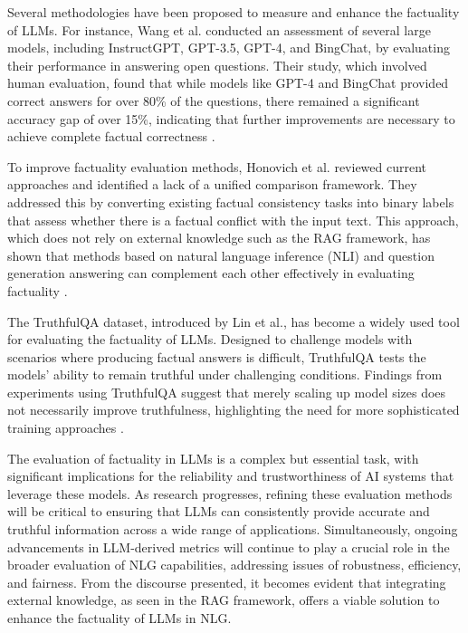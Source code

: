 Several methodologies have been proposed to measure and enhance the factuality of LLMs. For instance, Wang et al. conducted an assessment of several large models, including InstructGPT, GPT-3.5, GPT-4, and BingChat, by evaluating their performance in answering open questions. Their study, which involved human evaluation, found that while models like GPT-4 and BingChat provided correct answers for over 80\% of the questions, there remained a significant accuracy gap of over 15\%, indicating that further improvements are necessary to achieve complete factual correctness \cite{wang2024evaluating}.

To improve factuality evaluation methods, Honovich et al. reviewed current approaches and identified a lack of a unified comparison framework. They addressed this by converting existing factual consistency tasks into binary labels that assess whether there is a factual conflict with the input text. This approach, which does not rely on external knowledge such as the RAG framework, has shown that methods based on natural language inference (NLI) and question generation answering can complement each other effectively in evaluating factuality \cite{honovich2022true}.

The TruthfulQA dataset, introduced by Lin et al., has become a widely used tool for evaluating the factuality of LLMs. Designed to challenge models with scenarios where producing factual answers is difficult, TruthfulQA tests the models' ability to remain truthful under challenging conditions. Findings from experiments using TruthfulQA suggest that merely scaling up model sizes does not necessarily improve truthfulness, highlighting the need for more sophisticated training approaches \cite{lin2021truthfulqa}.

The evaluation of factuality in LLMs is a complex but essential task, with significant implications for the reliability and trustworthiness of AI systems that leverage these models. As research progresses, refining these evaluation methods will be critical to ensuring that LLMs can consistently provide accurate and truthful information across a wide range of applications. Simultaneously, ongoing advancements in LLM-derived metrics will continue to play a crucial role in the broader evaluation of NLG capabilities, addressing issues of robustness, efficiency, and fairness. From the discourse presented, it becomes evident that integrating external knowledge, as seen in the RAG framework, offers a viable solution to enhance the factuality of LLMs in NLG.

